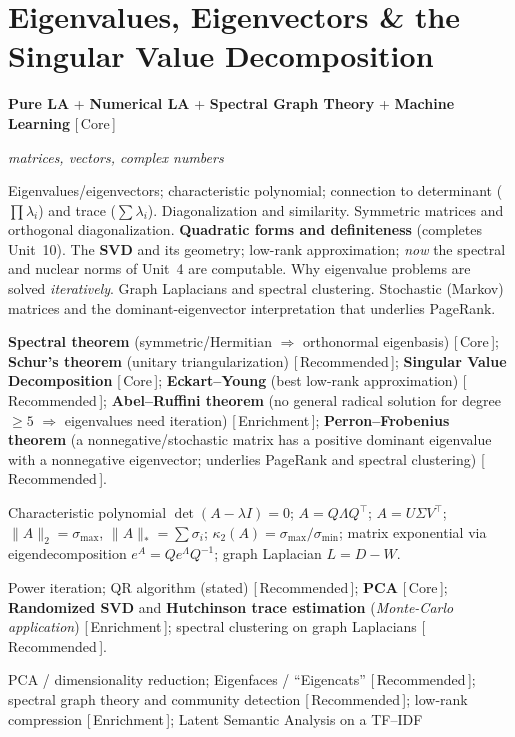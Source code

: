 \documentclass[11pt]{article}
\newcommand{\dom}[1]{{\sffamily\bfseries\color{RoyalBlue}#1}}
\newcommand{\pri}[1]{{\footnotesize\sffamily\color{BrickRed}[\,#1\,]}}
\newcommand{\obj}[1]{{\itshape #1}}
\newenvironment{unitfields}
  {\begin{description}[leftmargin=0pt,labelindent=0pt,style=nextline,
      font=\normalfont\sffamily\bfseries\color{RoyalBlue},itemsep=3pt,topsep=4pt]}
  {\end{description}}
\newcommand{\ff}[1]{\item[#1]}
\theoremstyle{definition}
\begin{document}
\section{Eigenvalues, Eigenvectors \& the Singular Value Decomposition}
\begin{unitfields}
\ff{Domain(s)} \dom{Pure LA} + \dom{Numerical LA} + \dom{Spectral Graph Theory} + \dom{Machine Learning} \pri{Core}
\ff{Primary object(s)} \obj{matrices, vectors, complex numbers}
\ff{Topics}
  Eigenvalues/eigenvectors; characteristic polynomial; connection to
  determinant ($\prod\lambda_i$) and trace ($\sum\lambda_i$). Diagonalization
  and similarity. Symmetric matrices and orthogonal diagonalization.
  \textbf{Quadratic forms and definiteness} (completes Unit~10). The
  \textbf{SVD} and its geometry; low-rank approximation; \emph{now} the
  spectral and nuclear norms of Unit~4 are computable. Why eigenvalue problems
  are solved \emph{iteratively}. Graph Laplacians and spectral clustering.
  Stochastic (Markov) matrices and the dominant-eigenvector interpretation that
  underlies PageRank.
\ff{Key theorems}
  \textbf{Spectral theorem} (symmetric/Hermitian $\Rightarrow$ orthonormal
  eigenbasis) \pri{Core};
  \textbf{Schur's theorem} (unitary triangularization) \pri{Recommended};
  \textbf{Singular Value Decomposition} \pri{Core};
  \textbf{Eckart--Young} (best low-rank approximation) \pri{Recommended};
  \textbf{Abel--Ruffini theorem} (no general radical solution for degree
  $\ge 5$ $\Rightarrow$ eigenvalues need iteration) \pri{Enrichment};
  \textbf{Perron--Frobenius theorem} (a nonnegative/stochastic matrix has a
  positive dominant eigenvalue with a nonnegative eigenvector; underlies
  PageRank and spectral clustering) \pri{Recommended}.
\ff{Tools / formulas}
  Characteristic polynomial $\det(A-\lambda I)=0$; $A=Q\Lambda Q^\top$;
  $A=U\Sigma V^\top$; $\|A\|_2=\sigma_{\max}$, $\|A\|_*=\sum\sigma_i$;
  $\kappa_2(A)=\sigma_{\max}/\sigma_{\min}$; matrix exponential via
  eigendecomposition $e^{A}=Qe^{\Lambda}Q^{-1}$; graph Laplacian $L=D-W$.
\ff{Algorithms}
  Power iteration; QR algorithm (stated) \pri{Recommended};
  \textbf{PCA} \pri{Core};
  \textbf{Randomized SVD} and \textbf{Hutchinson trace estimation}
  (\emph{Monte-Carlo application}) \pri{Enrichment};
  spectral clustering on graph Laplacians \pri{Recommended}.
\ff{Applications}
  PCA / dimensionality reduction; Eigenfaces / ``Eigencats'' \pri{Recommended};
  spectral graph theory and community detection \pri{Recommended};
  low-rank compression \pri{Enrichment}; Latent Semantic Analysis on a TF--IDF

\end{unitfields}
\end{document}
